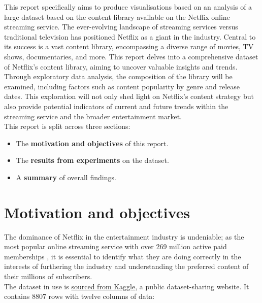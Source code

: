 \documentclass[12pt]{report}\usepackage[]{graphicx}\usepackage[]{xcolor}
\begin{document}
    \noindent This report specifically aims to produce visualisations based on an
    analysis of a large dataset based on the content library available on the Netflix online streaming service. 
    The ever-evolving landscape of streaming services versus traditional television has positioned Netflix
    as a giant in the industry. Central to its success is a vast content library, 
    encompassing a diverse range of movies, TV shows, documentaries, and more. This report delves 
    into a comprehensive dataset of Netflix's content library, aiming to uncover valuable insights 
    and trends. Through exploratory data analysis, the composition of the library will 
    be examined, including factors such as content popularity by genre and release dates.
    This exploration will not only shed light on Netflix's content strategy but also provide 
    potential indicators of current and future trends within the streaming service and the
    broader entertainment market.\\

    

    \noindent This report is split across three sections:
    \begin{itemize}
        \item The \textbf{motivation and objectives} of this report.
        \item The \textbf{results from experiments} on the dataset.
        \item A \textbf{summary} of overall findings.
    \end{itemize}

    \pagebreak

    \chapter{Motivation and objectives}

    
    The dominance of Netflix in the entertainment industry is undeniable; as the most popular online streaming
    service with over 269 million active paid memberships \autocite{NetflixSubStats}, it is essential to identify
    what they are doing correctly in the interests of furthering the industry and understanding the preferred
    content of their millions of subscribers.\\

    
    \noindent The dataset in use is \href{https://www.kaggle.com/datasets/shivamb/netflix-shows/data}{sourced from Kaggle}, a 
    public dataset-sharing website. It contains 8807 rows with twelve columns of data:
    
\end{document}
